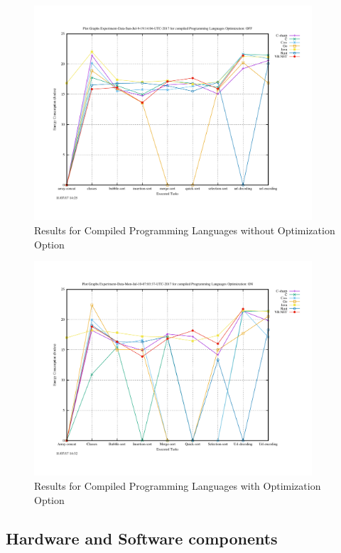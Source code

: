\begin{figure}
	\centering
	\includegraphics[width=\textwidth,height=8cm]{"Graph_Experiment-Data-Sun-Jul-9-19:14:04-UTC-2017_compiled_Optimization_OFF"}
	\caption{Results for Compiled Programming Languages without Optimization Option}
	\label{Compiled with No Optimization}
\end{figure}

\begin{figure}
	\centering
	\includegraphics[width=\textwidth,height=8cm]{"Graph_Experiment-Data-Mon-Jul-10-07:03:37-UTC-2017_compiled_Optimization_On"}
	\caption{Results for Compiled Programming Languages with Optimization Option}
	\label{Compiled with Optimization Option}
\end{figure}

\subsection{Hardware and Software components}

